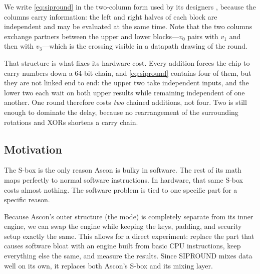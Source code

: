 We write \eqref{eq:sipround} in the two-column form used by its designers \cite{siphash}, because the columns carry information: the left and right halves of each block are independent and may be evaluated at the same time. Note that the two columns exchange partners between the upper and lower blocks---$v_0$ pairs with $v_1$ and then with $v_3$---which is the crossing visible in a datapath drawing of the round.

That structure is what fixes its hardware cost. Every addition forces the chip to carry numbers down a 64-bit chain, and \eqref{eq:sipround} contains four of them, but they are not linked end to end: the upper two take independent inputs, and the lower two each wait on both upper results while remaining independent of one another. One round therefore costs \emph{two} chained additions, not four. Two is still enough to dominate the delay, because no rearrangement of the surrounding rotations and XORs shortens a carry chain.

\subsection{Motivation}
\label{sec:motivation}

The S-box is the only reason Ascon is bulky in software. The rest of its math maps perfectly to normal software instructions. In hardware, that same S-box costs almost nothing. The software problem is tied to one specific part for a specific reason.

Because Ascon's outer structure (the mode) is completely separate from its inner engine, we can swap the engine while keeping the keys, padding, and security setup exactly the same. This allows for a direct experiment: replace the part that causes software bloat with an engine built from basic CPU instructions, keep everything else the same, and measure the results. Since SIPROUND mixes data well on its own, it replaces both Ascon's S-box and its mixing layer.
